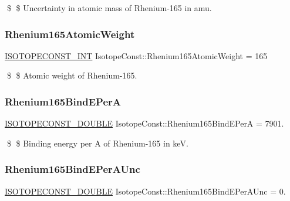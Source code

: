 \$ \$ Uncertainty in atomic mass of Rhenium-\/165 in amu. \mbox{\label{group___isotope_const-_rhenium-_re165_ga7458d3dcf9c9b1cd4246d9709ef34410}} 
\subsubsection{\texorpdfstring{Rhenium165\+Atomic\+Weight}{Rhenium165AtomicWeight}}
{\footnotesize\ttfamily \mbox{\hyperlink{group___isotope_const-_macros_ga5f18360b3e99483a35c32d789e62621c}{I\+S\+O\+T\+O\+P\+E\+C\+O\+N\+S\+T\+\_\+\+I\+NT}} Isotope\+Const\+::\+Rhenium165\+Atomic\+Weight = 165}

\$ \$ Atomic weight of Rhenium-\/165. \mbox{\label{group___isotope_const-_rhenium-_re165_ga186c0aa79286df2696c1840f5c5e915f}} 
\subsubsection{\texorpdfstring{Rhenium165\+Bind\+E\+PerA}{Rhenium165BindEPerA}}
{\footnotesize\ttfamily \mbox{\hyperlink{group___isotope_const-_macros_ga8f45a7272ce02c0b4c65c44636ed719a}{I\+S\+O\+T\+O\+P\+E\+C\+O\+N\+S\+T\+\_\+\+D\+O\+U\+B\+LE}} Isotope\+Const\+::\+Rhenium165\+Bind\+E\+PerA = 7901.}

\$ \$ Binding energy per A of Rhenium-\/165 in keV. \mbox{\label{group___isotope_const-_rhenium-_re165_gacf67c4a45bcfc60ccaf2c7092fe2ad42}} 
\subsubsection{\texorpdfstring{Rhenium165\+Bind\+E\+Per\+A\+Unc}{Rhenium165BindEPerAUnc}}
{\footnotesize\ttfamily \mbox{\hyperlink{group___isotope_const-_macros_ga8f45a7272ce02c0b4c65c44636ed719a}{I\+S\+O\+T\+O\+P\+E\+C\+O\+N\+S\+T\+\_\+\+D\+O\+U\+B\+LE}} Isotope\+Const\+::\+Rhenium165\+Bind\+E\+Per\+A\+Unc = 0.}

